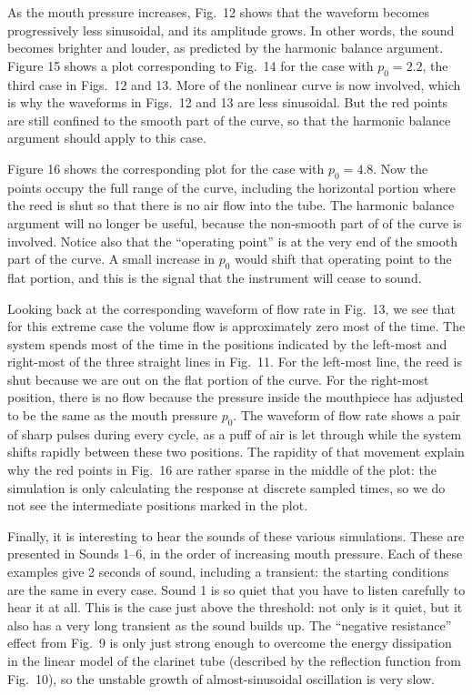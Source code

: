   As the mouth pressure increases, Fig.\ 12 shows that the waveform becomes 
  progressively less sinusoidal, and its amplitude grows. In other words, the 
  sound becomes brighter and louder, as predicted by the harmonic balance 
  argument. Figure 15 shows a plot corresponding to Fig.\ 14 for the case with 
  $p_0=2.2$, the third case in Figs.\ 12 and 13. More of the nonlinear curve is 
  now involved, which is why the waveforms in Figs.\ 12 and 13 are less 
  sinusoidal. But the red points are still confined to the smooth part of the 
  curve, so that the harmonic balance argument should apply to this case. 

  Figure 16 shows the corresponding plot for the case with $p_0=4.8$. Now the 
  points occupy the full range of the curve, including the horizontal portion 
  where the reed is shut so that there is no air flow into the tube. The 
  harmonic balance argument will no longer be useful, because the non-smooth 
  part of of the curve is involved. Notice also that the ``operating point'' is 
  at the very end of the smooth part of the curve. A small increase in $p_0$ 
  would shift that operating point to the flat portion, and this is the signal 
  that the instrument will cease to sound. 

  Looking back at the corresponding waveform of flow rate in Fig.\ 13, we see 
  that for this extreme case the volume flow is approximately zero most of the 
  time. The system spends most of the time in the positions indicated by the 
  left-most and right-most of the three straight lines in Fig.\ 11. For the 
  left-most line, the reed is shut because we are out on the flat portion of 
  the curve. For the right-most position, there is no flow because the pressure 
  inside the mouthpiece has adjusted to be the same as the mouth pressure 
  $p_0$. The waveform of flow rate shows a pair of sharp pulses during every 
  cycle, as a puff of air is let through while the system shifts rapidly 
  between these two positions. The rapidity of that movement explain why the 
  red points in Fig.\ 16 are rather sparse in the middle of the plot: the 
  simulation is only calculating the response at discrete sampled times, so we 
  do not see the intermediate positions marked in the plot. 

  Finally, it is interesting to hear the sounds of these various simulations. 
  These are presented in Sounds 1--6, in the order of increasing mouth 
  pressure. Each of these examples give 2 seconds of sound, including a 
  transient: the starting conditions are the same in every case. Sound 1 is so 
  quiet that you have to listen carefully to hear it at all. This is the case 
  just above the threshold: not only is it quiet, but it also has a very long 
  transient as the sound builds up. The ``negative resistance'' effect from 
  Fig.\ 9 is only just strong enough to overcome the energy dissipation in the 
  linear model of the clarinet tube (described by the reflection function from 
  Fig.\ 10), so the unstable growth of almost-sinusoidal oscillation is very 
  slow. 

